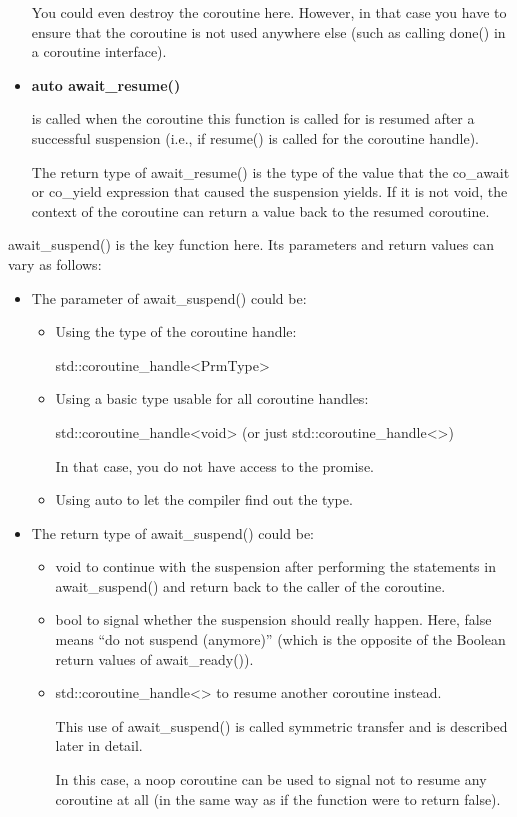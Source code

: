 \begin{itemize}
You could even destroy the coroutine here. However, in that case you have to ensure that the coroutine is not used anywhere else (such as calling done() in a coroutine interface).

\item 
\textbf{auto await\_resume()}

is called when the coroutine this function is called for is resumed after a successful suspension (i.e., if resume() is called for the coroutine handle).

The return type of await\_resume() is the type of the value that the co\_await or co\_yield expression that caused the suspension yields. If it is not void, the context of the coroutine can return a value back to the resumed coroutine.
\end{itemize}

await\_suspend() is the key function here. Its parameters and return values can vary as follows:

\begin{itemize}
\item 
The parameter of await\_suspend() could be:

\begin{itemize}
\item 
Using the type of the coroutine handle:
\begin{cpp}
std::coroutine_handle<PrmType>
\end{cpp}

\item 
Using a basic type usable for all coroutine handles:
\begin{cpp}
std::coroutine_handle<void> (or just std::coroutine_handle<>)
\end{cpp}

In that case, you do not have access to the promise.

\item 
Using auto to let the compiler find out the type.
\end{itemize}

\item 
The return type of await\_suspend() could be:
\begin{itemize}
\item 
void to continue with the suspension after performing the statements in await\_suspend() and return back to the caller of the coroutine.

\item 
bool to signal whether the suspension should really happen. Here, false means “do not suspend (anymore)” (which is the opposite of the Boolean return values of await\_ready()).

\item 
std::coroutine\_handle<> to resume another coroutine instead.

This use of await\_suspend() is called symmetric transfer and is described later in detail.

In this case, a noop coroutine can be used to signal not to resume any coroutine at all (in the same way as if the function were to return false).
\end{itemize}
\end{itemize}

